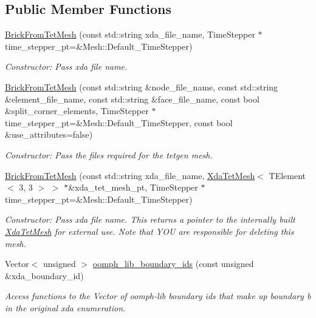 \subsection*{Public Member Functions}
\begin{DoxyCompactItemize}
\item 
\hyperlink{classoomph_1_1BrickFromTetMesh_abed00a445cc3c6b6cc00d32e0db4a366}{Brick\+From\+Tet\+Mesh} (const std\+::string xda\+\_\+file\+\_\+name, Time\+Stepper $\ast$time\+\_\+stepper\+\_\+pt=\&Mesh\+::\+Default\+\_\+\+Time\+Stepper)
\begin{DoxyCompactList}\small\item\em Constructor\+: Pass xda file name. \end{DoxyCompactList}\item 
\hyperlink{classoomph_1_1BrickFromTetMesh_af05fe6ff520986d7794c467fc1885f92}{Brick\+From\+Tet\+Mesh} (const std\+::string \&node\+\_\+file\+\_\+name, const std\+::string \&element\+\_\+file\+\_\+name, const std\+::string \&face\+\_\+file\+\_\+name, const bool \&split\+\_\+corner\+\_\+elements, Time\+Stepper $\ast$time\+\_\+stepper\+\_\+pt=\&Mesh\+::\+Default\+\_\+\+Time\+Stepper, const bool \&use\+\_\+attributes=false)
\begin{DoxyCompactList}\small\item\em Constructor\+: Pass the files required for the tetgen mesh. \end{DoxyCompactList}\item 
\hyperlink{classoomph_1_1BrickFromTetMesh_a49d6a583221a04f2997dae4509592350}{Brick\+From\+Tet\+Mesh} (const std\+::string xda\+\_\+file\+\_\+name, \hyperlink{classoomph_1_1XdaTetMesh}{Xda\+Tet\+Mesh}$<$ T\+Element$<$ 3, 3 $>$ $>$ $\ast$\&xda\+\_\+tet\+\_\+mesh\+\_\+pt, Time\+Stepper $\ast$time\+\_\+stepper\+\_\+pt=\&Mesh\+::\+Default\+\_\+\+Time\+Stepper)
\begin{DoxyCompactList}\small\item\em Constructor\+: Pass xda file name. This returns a pointer to the internally built \hyperlink{classoomph_1_1XdaTetMesh}{Xda\+Tet\+Mesh} for external use. Note that Y\+OU are responsible for deleting this mesh. \end{DoxyCompactList}\item 
Vector$<$ unsigned $>$ \hyperlink{classoomph_1_1BrickFromTetMesh_aeca8c8e899bdafb9eb24f36c500c7df6}{oomph\+\_\+lib\+\_\+boundary\+\_\+ids} (const unsigned \&xda\+\_\+boundary\+\_\+id)
\begin{DoxyCompactList}\small\item\em Access functions to the Vector of oomph-\/lib boundary ids that make up boundary b in the original xda enumeration. \end{DoxyCompactList}\end{DoxyCompactItemize}

